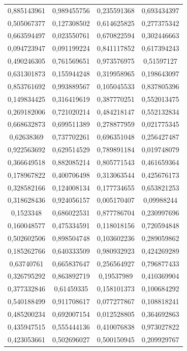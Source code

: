 \documentclass[a4paper,12pt]{article}
\begin{document}
\begin{longtable}{|c|c|c|c|}
  0,885143961 & 0,989455756 & 0,235591368 & 0,693434397 \\
  0,505067377 & 0,127308502 & 0,614625825 & 0,277375342 \\
  0,663594497 & 0,023550761 & 0,670822594 & 0,302446663 \\
  0,094723947 & 0,091199224 & 0,841117852 & 0,617394243 \\
  0,490246305 & 0,761569651 & 0,973576975 & 0,51597127 \\
  0,631301873 & 0,155944248 & 0,319958965 & 0,198643097 \\
  0,853761692 & 0,993889567 & 0,105045533 & 0,837805396 \\
  0,149834425 & 0,316419619 & 0,387770251 & 0,552013475 \\
  0,269182006 & 0,721020214 & 0,484218147 & 0,552132834 \\
  0,668632873 & 0,699511389 & 0,278877959 & 0,021775345 \\
  0,62638369 & 0,737702261 & 0,696351048 & 0,256427487 \\
  0,922563692 & 0,629514529 & 0,789891184 & 0,019748079 \\
  0,366649518 & 0,882085214 & 0,805771543 & 0,461659364 \\
  0,178967822 & 0,400706498 & 0,313063544 & 0,425676173 \\
  0,328582166 & 0,124008134 & 0,177734655 & 0,653821253 \\
  0,318628436 & 0,924056157 & 0,005170407 & 0,09988244 \\
  0,1523348 & 0,686022531 & 0,877786704 & 0,230997696 \\
  0,160048577 & 0,475334591 & 0,118018156 & 0,720594848 \\
  0,502602506 & 0,898504748 & 0,103602236 & 0,289059862 \\
  0,185262766 & 0,640333509 & 0,980932923 & 0,424269289 \\
  0,63740761 & 0,665837647 & 0,256564927 & 0,796877433 \\
  0,326795292 & 0,863892719 & 0,19537989 & 0,410369904 \\
  0,377332846 & 0,61459335 & 0,158101373 & 0,100684292 \\
  0,540188499 & 0,911708617 & 0,077277867 & 0,108818241 \\
  0,485200234 & 0,692007154 & 0,012528805 & 0,364692863 \\
  0,435947515 & 0,555444136 & 0,410076838 & 0,973027822 \\
  0,423053661 & 0,502696027 & 0,500150945 & 0,209929767 \\

\end{longtable}
\end{document}
